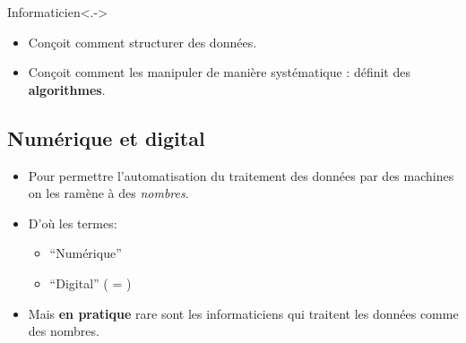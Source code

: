 \documentclass{beamer}
\newcommand{\forme}[1]{\enquote{#1}}
\begin{document}
\begin{slide}
	\begin{block}{Informaticien}<.->
		\begin{itemize}
			\item Conçoit comment structurer des données.
			\item Conçoit comment les manipuler de manière systématique : définit des \textbf{algorithmes}.
		\end{itemize}
	\end{block}
\end{slide}
\subsection{Numérique et digital}

\begin{slide}

	\begin{itemize}
		\item Pour permettre l'automatisation du traitement des données par des machines on les ramène à des \emph{nombres}.
		\item D'où les termes:
			\begin{itemize}
				\item \forme{Numérique}
				\item \forme{Digital} ( = )
			\end{itemize}
		\item Mais \textbf{en pratique} rare sont les informaticiens qui traitent les données comme des nombres. 
	\end{itemize}
\end{slide}
\end{document}

